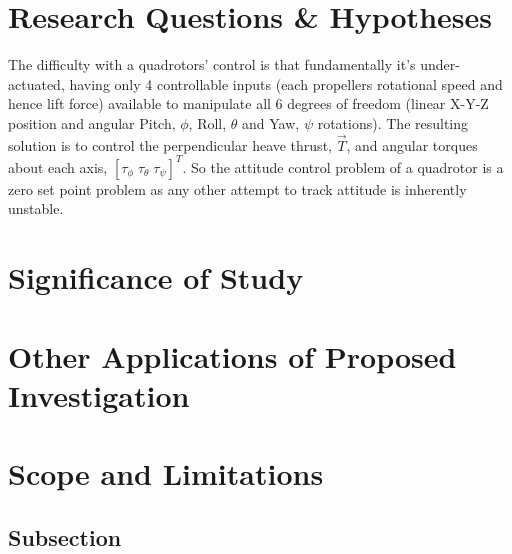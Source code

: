 \section{Research Questions \& Hypotheses}
\label{sec:ch1.hypotheses}
The difficulty with a quadrotors' control is that fundamentally it's under-actuated, having only 4 controllable inputs (each propellers rotational speed and hence lift force) available to manipulate all 6 degrees of freedom (linear X-Y-Z position and angular Pitch, $\phi$, Roll, $\theta$ and Yaw, $\psi$ rotations). The resulting solution is to control the perpendicular heave thrust, $\vec{T}$, and angular torques about each axis, $[\tau_\phi\;\tau_\theta\;\tau_\psi]^T$. So the attitude control problem of a quadrotor is a zero set point problem as any other attempt to track attitude is inherently unstable.
\section{Significance of Study}
\label{sec:ch1.significance}

\section{Other Applications of Proposed Investigation}
\label{sec:ch1.applications}

\section{Scope and Limitations}
\label{sec:ch1.scope}

\subsection{Subsection}
\label{subsec:ch1.section1.subsec1}

